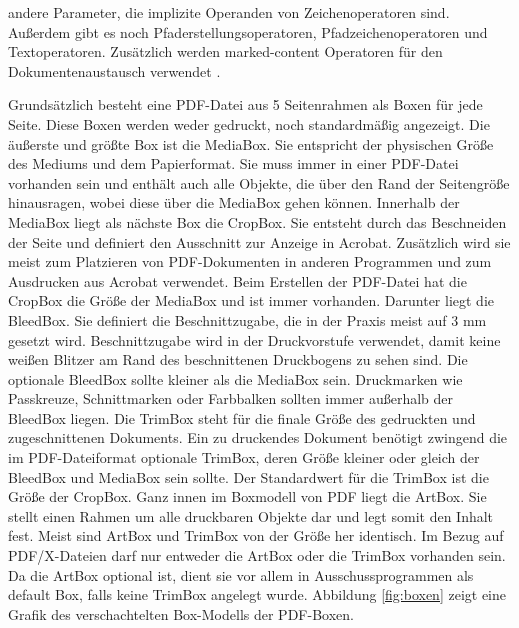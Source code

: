andere Parameter, die implizite Operanden von Zeichenoperatoren sind. Außerdem gibt es noch Pfaderstellungsoperatoren, Pfadzeichenoperatoren und Textoperatoren. Zusätzlich werden marked-content Operatoren für den Dokumentenaustausch verwendet\cite{fileformat} . 
\par
Grundsätzlich besteht eine PDF-Datei aus 5 Seitenrahmen als Boxen für jede Seite. Diese Boxen werden weder gedruckt, noch standardmäßig angezeigt. Die äußerste und größte Box ist die MediaBox. Sie entspricht der physischen Größe des Mediums und dem Papierformat. Sie muss immer in einer PDF-Datei vorhanden sein und enthält auch alle Objekte, die über den Rand der Seitengröße hinausragen, wobei diese über die MediaBox gehen können. Innerhalb der MediaBox liegt als nächste Box die CropBox. Sie entsteht durch das Beschneiden der Seite und definiert den Ausschnitt zur Anzeige in Acrobat. Zusätzlich wird sie meist zum Platzieren von PDF-Dokumenten in anderen Programmen und zum Ausdrucken aus Acrobat verwendet. Beim Erstellen der PDF-Datei hat die CropBox die Größe der MediaBox und ist immer vorhanden. Darunter liegt die BleedBox. Sie definiert die Beschnittzugabe, die in der Praxis meist auf 3 mm gesetzt wird. Beschnittzugabe wird in der Druckvorstufe verwendet, damit keine weißen Blitzer am Rand des beschnittenen Druckbogens zu sehen sind. Die optionale BleedBox sollte kleiner als die MediaBox sein. Druckmarken wie Passkreuze, Schnittmarken oder Farbbalken sollten immer außerhalb der BleedBox liegen. Die TrimBox steht für die finale Größe des gedruckten und zugeschnittenen Dokuments. Ein zu druckendes Dokument benötigt zwingend die im PDF-Dateiformat optionale TrimBox, deren Größe kleiner oder gleich der BleedBox und MediaBox sein sollte. Der Standardwert für die TrimBox ist die Größe der CropBox. Ganz innen im Boxmodell von PDF liegt die ArtBox. Sie stellt einen Rahmen um alle druckbaren Objekte dar und legt somit den Inhalt fest. Meist sind ArtBox und TrimBox von der Größe her identisch. Im Bezug auf PDF/X-Dateien darf nur entweder die ArtBox oder die TrimBox vorhanden sein. Da die ArtBox optional ist, dient sie vor allem in Ausschussprogrammen als default Box, falls keine TrimBox angelegt wurde. Abbildung \ref{fig:boxen} zeigt eine Grafik des verschachtelten Box-Modells der PDF-Boxen.

